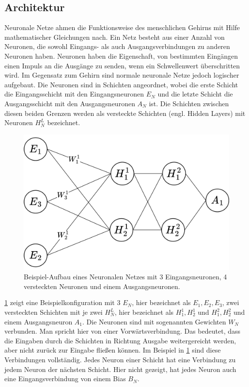 \subsection{Architektur}
Neuronale Netze ahmen die Funktionsweise des menschlichen Gehirns mit Hilfe mathematischer Gleichungen nach.
Ein Netz besteht aus einer Anzahl von Neuronen, die sowohl Eingangs- als auch Ausgangsverbindungen zu anderen Neuronen haben.
Neuronen haben die Eigenschaft, von bestimmten Eingängen einen Impuls an die Ausgänge zu senden, wenn ein Schwellenwert überschritten wird.
Im Gegensatz zum Gehirn sind normale neuronale Netze jedoch logischer aufgebaut.
Die Neuronen sind in Schichten angeordnet, wobei die erste Schicht die Eingangsschicht mit den Eingangsneuronen $E_N$ und die letzte Schicht die Ausgangsschicht mit den Ausgangsneuronen $A_N$ ist.
Die Schichten zwischen diesen beiden Grenzen werden als versteckte Schichten (engl. Hidden Layers) mit Neuronen $H^L_N$ bezeichnet.\\

\begin{figure}
    \centering
    \includegraphics[width=\textwidth]{zeichnungen/nn.png}
    \caption{Beispiel-Aufbau eines Neuronalen Netzes mit 3 Eingangsneuronen, 4 versteckten Neuronen und einem Ausgangsneuronen.}\label{nn_simple}
\end{figure}

\cref{nn_simple} zeigt eine Beispielkonfiguration mit 3 $E_N$, hier bezeichnet als $E_1,E_2,E_3$, zwei versteckten Schichten mit je zwei $H^L_N$, hier bezeichnet als $H^1_1, H^1_2$ und $H^2_1, H^2_2$ und einem Ausgangsneuron $A_1$.
Die Neuronen sind mit sogenannten Gewichten $W_N$ verbunden. Man spricht hier von einer Vorwärtsverbindung.
Das bedeutet, dass die Eingaben durch die Schichten in Richtung Ausgabe weitergereicht werden, aber nicht zurück zur Eingabe fließen können.
Im Beispiel in \cref{nn_simple} sind diese Verbindungen vollständig.
Jedes Neuron einer Schicht hat eine Verbindung zu jedem Neuron der nächsten Schicht.
Hier nicht gezeigt, hat jedes Neuron auch eine Eingangsverbindung von einem Bias $B_N$.

